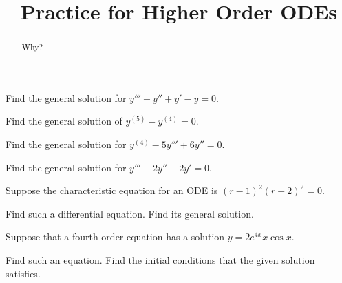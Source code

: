 \documentclass{ximera}
\title{Practice for Higher Order ODEs}
\begin{document}
\begin{abstract}
    Why?
\end{abstract}
\maketitle

 

\begin{exercise}
    Find the general solution for $y''' - y'' + y' - y = 0$.
\end{exercise}

\begin{exercise}%
    Find the general solution of $y^{(5)}-y^{(4)}=0$.
\end{exercise}

\begin{exercise}
    Find the general solution for $y^{(4)} - 5 y''' + 6 y'' = 0$.
\end{exercise}

\begin{exercise}
    Find the general solution for $y''' + 2 y'' + 2 y' = 0$.
\end{exercise}

\begin{exercise}
    Suppose the characteristic equation for an ODE is ${(r-1)}^2{(r-2)}^2 = 0$.
    \begin{tasks}
        \task Find such a differential equation.
        \task Find its general solution.
    \end{tasks}
\end{exercise}

\begin{exercise} \label{hol:eqfromsolex}
    Suppose that a fourth order equation has a solution $y = 2 e^{4x} x \cos x$.  
    \begin{tasks}
        \task Find such an equation.
        \task Find the initial conditions that the given solution satisfies.
    \end{tasks}
\end{exercise}
\end{document}

